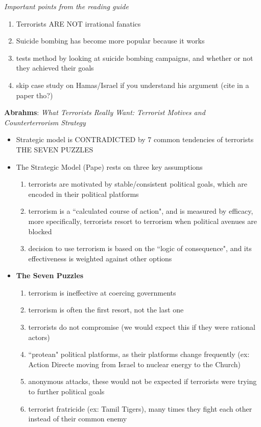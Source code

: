 \documentclass{article}
\begin{document}
\textit{Important points from the reading guide}
\begin{enumerate}
    \item Terrorists ARE NOT irrational fanatics
    \item Suicide bombing has become more popular because it works
    \item tests method by looking at suicide bombing campaigns, and whether or not they achieved their goals
    \item skip case study on Hamas/Israel if you understand his argument (cite in a paper tho?)
\end{enumerate}
\bigskip
\textbf{Abrahms}: \textit{What Terrorists Really Want: Terrorist Motives and Counterterrorism Strategy}
\begin{itemize}
    \item Strategic model is CONTRADICTED by 7 common tendencies of terrorists THE SEVEN PUZZLES
    \item The Strategic Model (Pape) rests on three key assumptions
    \begin{enumerate}
        \item terrorists are motivated by stable/consistent political goals, which are encoded in their political platforms
        \item terrorism is a ``calculated course of action", and is measured by efficacy, more specifically, terrorists resort to terrorism when political avenues are blocked
        \item decision to use terrorism is based on the ``logic of consequence", and its effectiveness is weighted against other options
    \end{enumerate}
    \item \textbf{The Seven Puzzles}
    \begin{enumerate}
        \item terrorism is ineffective at coercing governments
        \item terrorism is often the first resort, not the last one
        \item terrorists do not compromise (we would expect this if they were rational actors)
        \item ``protean" political platforms, as their platforms change frequently (ex: Action Directe moving from Israel to nuclear energy to the Church)
        \item anonymous attacks, these would not be expected if terrorists were trying to further political goals
        \item terrorist fratricide (ex: Tamil Tigers), many times they fight each other instead of their common enemy

\end{enumerate}
\end{itemize}
\end{document}
